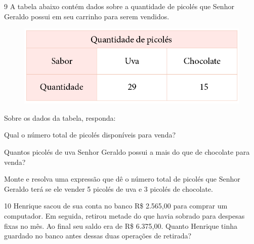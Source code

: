 
\num{9} A tabela abaixo contém dados sobre a quantidade de picolés que
Senhor Geraldo possui em seu carrinho para serem vendidos.

\begin{figure}[htpb!]
\centering
\includegraphics[width=.7\textwidth]{../ilustracoes/MAT5/SAEB_5ANO_MAT_figura92.png}
\end{figure}


\pagebreak
Sobre os dados da tabela, responda:

\begin{escolha}
\item
  Qual o número total de picolés disponíveis para venda?

\bigskip

\item
Quantos picolés de uva Senhor Geraldo possui a mais do que de chocolate
para venda?

\bigskip

\item
Monte e resolva uma expressão que dê o número total de picolés que Senhor
Geraldo terá se ele vender 5 picolés de uva e 3 picolés de chocolate.

\end{escolha}

\num{10} Henrique sacou de sua conta no banco R\$ 2.565,00 para comprar
um computador. Em seguida, retirou metade do que havia sobrado para
despesas fixas no mês. Ao final seu saldo era de R\$ 6.375,00. Quanto
Henrique tinha guardado no banco antes dessas duas operações de retirada?

